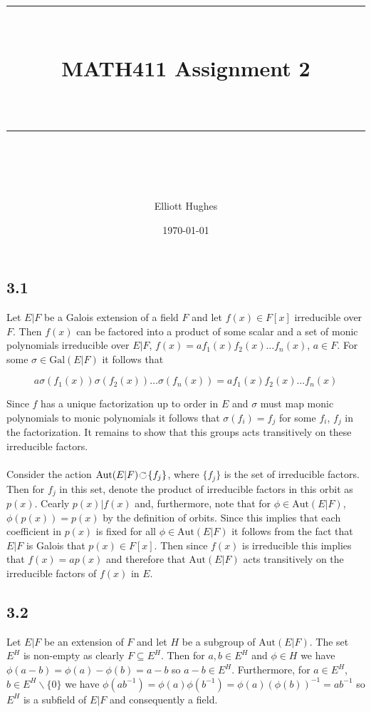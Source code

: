 \documentclass{article}
\title{	
	\normalfont\normalsize 
	\rule{\linewidth}{0.5pt}\\ %
	\vspace{14pt} %
	{\LARGE MATH411 Assignment 2\\ %
    \large \textit{} \\}
	\vspace{6pt} %
	\rule{\linewidth}{1pt}\\ %
}
\author{Elliott Hughes}
\date{\normalsize\today}
\def\acts{\rotatebox[origin=c]{-60}{$\circlearrowright$}}
\begin{document}
\maketitle

\subsection*{3.1}
Let $E|F$ be a Galois extension of a field $F$ and let $f(x) \in F[x]$ irreducible over $F$. Then 
$f(x)$ can be factored into a product of some scalar and a set of monic polynomials irreducible 
over $E|F$, $f(x) = af_1(x)f_2(x)\dots f_n(x)$, $a \in F$. For some $\sigma \in \text{Gal}(E|F)$ it follows that 

\begin{equation*}
	a\sigma(f_1(x))\sigma(f_2(x))\dots \sigma(f_n(x)) = af_1(x)f_2(x)\dots f_n(x)
\end{equation*}

Since $f$ has a unique factorization up to order in $E$ and $\sigma$ must map monic polynomials to 
monic polynomials it follows that $\sigma(f_i) = f_j$ for some $f_i$, $f_j$ in the factorization. 
It remains to show that this groups acts transitively on these irreducible factors. 

\paragraph{}
Consider the action $\text{Aut}(E|F) \acts \{f_j\}$, where $\{f_j\}$ is the set of 
irreducible factors. Then for $f_j$ in this set, denote the product of irreducible factors in 
this orbit as $p(x)$. Cearly $p(x)|f(x)$ and, furthermore, note that for $\phi \in \text{Aut}(E|F)$, 
$\phi(p(x)) = p(x)$ by the definition of orbits. Since this implies that each coefficient in $p(x)$ 
is fixed for all $\phi \in \text{Aut}(E|F)$ it follows from the fact that $E|F$ is Galois that 
$p(x) \in F[x]$. Then since $f(x)$ is irreducible this implies that $f(x) = ap(x)$ and therefore 
that $\text{Aut}(E|F)$ acts transitively on the irreducible factors of $f(x)$ in $E$.

\subsection*{3.2}
Let $E|F$ be an extension of $F$ and let $H$ be a subgroup of $\text{Aut}(E|F)$. The set $E^H$ is 
non-empty as clearly $F \subseteq E^H$. Then for $a,b \in E^H$ and $\phi \in H$ we have 
$\phi(a - b) = \phi(a) -\phi(b) = a -b$ so $a-b \in E^H$. Furthermore, for $a \in E^H$, $b \in E^H\backslash\{0\}$ 
we have $\phi(ab^{-1}) = \phi(a)\phi(b^{-1}) = \phi(a)(\phi(b))^{-1} = ab^{-1}$ so $E^H$ is a subfield 
of $E|F$ and consequently a field.
\end{document}
